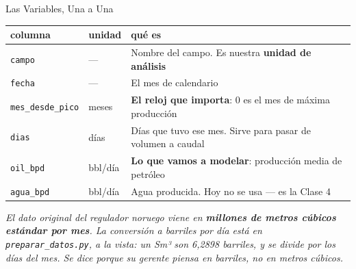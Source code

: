 \documentclass[aspectratio=169, 11pt]{beamer}
\begin{document}
\begin{frame}[shrink=10]{Las Variables, Una a Una}
  \vspace{-4pt}
  {\footnotesize
  \renewcommand{\arraystretch}{1.25}
  \begin{tabular}{@{}p{3.3cm}p{2.0cm}p{9.4cm}@{}}
    \toprule
    {\color{arcaDark}\bfseries columna} &
    {\color{arcaDark}\bfseries unidad} &
    {\color{arcaDark}\bfseries qué es} \\
    \midrule
    \texttt{campo} & --- & Nombre del campo. Es nuestra \textbf{unidad de análisis} \\
    \texttt{fecha} & --- & El mes de calendario \\
    \texttt{mes\_desde\_pico} & meses & \textbf{El reloj que importa}: 0 es el mes de máxima producción \\
    \texttt{dias} & días & Días que tuvo ese mes. Sirve para pasar de volumen a caudal \\
    \texttt{oil\_bpd} & bbl/día & \textbf{Lo que vamos a modelar}: producción media de petróleo \\
    \texttt{agua\_bpd} & bbl/día & Agua producida. Hoy no se usa --- es la Clase 4 \\
    \bottomrule
  \end{tabular}}
  \vspace{8pt}

  {\scriptsize\color{textMuted}\itshape
   El dato original del regulador noruego viene en \textbf{millones de metros
   cúbicos estándar por mes}. La conversión a barriles por día está en
   \texttt{preparar\_datos.py}, a la vista: un Sm³ son 6{,}2898 barriles, y se
   divide por los días del mes. Se dice porque su gerente piensa en barriles,
   no en metros cúbicos.}
\end{frame}
\end{document}
